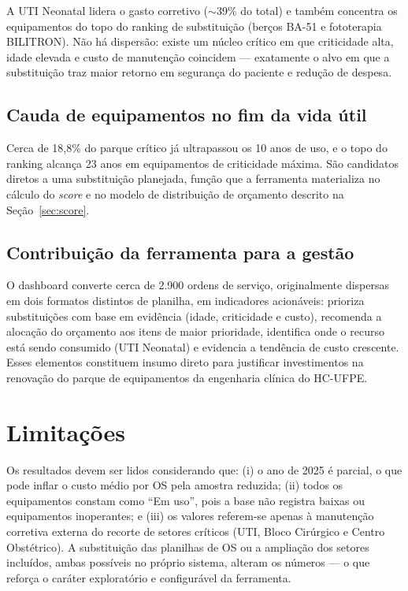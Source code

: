 A UTI Neonatal lidera o gasto corretivo ($\sim$39\% do total) e também concentra
os equipamentos do topo do ranking de substituição (berços BA-51 e fototerapia
BILITRON). Não há dispersão: existe um núcleo crítico em que
criticidade alta, idade elevada e custo de manutenção coincidem --- exatamente o
alvo em que a substituição traz maior retorno em segurança do paciente e redução
de despesa.

\subsection*{Cauda de equipamentos no fim da vida útil}

Cerca de 18,8\% do parque crítico já ultrapassou os 10 anos de uso, e o topo do
ranking alcança 23 anos em equipamentos de criticidade máxima. São candidatos
diretos a uma substituição planejada, função que a ferramenta materializa no
cálculo do \textit{score} e no modelo de distribuição de orçamento descrito na
Seção~\ref{sec:score}.

\subsection*{Contribuição da ferramenta para a gestão}

O dashboard converte cerca de 2.900 ordens de serviço, originalmente dispersas em
dois formatos distintos de planilha, em indicadores acionáveis: prioriza
substituições com base em evidência (idade, criticidade e custo), recomenda a
alocação do orçamento aos itens de maior prioridade, identifica onde o recurso
está sendo consumido (UTI Neonatal) e evidencia a tendência de custo crescente.
Esses elementos constituem insumo direto para justificar investimentos na
renovação do parque de equipamentos da engenharia clínica do HC-UFPE.

\section{Limitações}

Os resultados devem ser lidos considerando que: (i) o ano de 2025 é parcial, o que
pode inflar o custo médio por OS pela amostra reduzida; (ii) todos os equipamentos
constam como ``Em uso'', pois a base não registra baixas ou equipamentos
inoperantes; e (iii) os valores referem-se apenas à manutenção corretiva externa
do recorte de setores críticos (UTI, Bloco Cirúrgico e Centro Obstétrico). A
substituição das planilhas de OS ou a ampliação dos setores incluídos, ambas
possíveis no próprio sistema, alteram os números --- o que reforça o caráter
exploratório e configurável da ferramenta.
